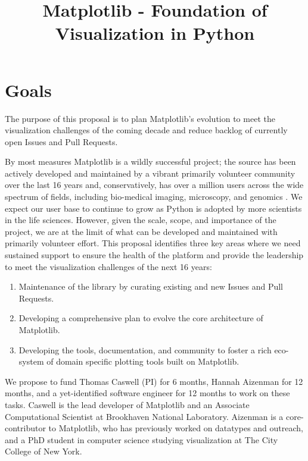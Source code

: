 \documentclass[11pt]{article}  %
\begin{document}
\title{Matplotlib - Foundation of Visualization in Python}
\author{}
\maketitle

\section{Goals}

The purpose of this proposal is to plan Matplotlib's evolution to meet
the visualization challenges of the coming decade and reduce backlog
of currently open Issues and Pull Requests.

By most measures Matplotlib is a wildly successful project; the source
has been actively developed and maintained by a vibrant primarily
volunteer community over the last 16 years and, conservatively, has
over a million users across the wide spectrum of fields, including
bio-medical imaging, microscopy, and genomics
\cite{Carpenter2006,Wolf2018,10.7717/peerj.453}
\cite{Segata2011,10.1371/journal.pgen.1000695,HASHIMSHONY2012666,
  10.1093/bioinformatics/bts480,Carlile2014,Laganowsky2014,Jiangaac9462,
  10.3389/fninf.2014.00014}.  We expect our user base to continue to
grow as Python is adopted by more scientists in the life sciences.
However, given the scale, scope, and importance of the project, we are
at the limit of what can be developed and maintained with primarily
volunteer effort.  This proposal identifies three key areas where we
need sustained support to ensure the health of the platform and
provide the leadership to meet the visualization challenges of the
next 16 years:

\begin{enumerate}[label=\alph*)]
  \item Maintenance of the library by curating existing and new Issues
    and Pull Requests.
  \item Developing a comprehensive plan to evolve the core architecture
    of Matplotlib.
  \item Developing the tools, documentation, and community to foster a
    rich eco-system of domain specific plotting tools built on
    Matplotlib.
\end{enumerate}

We propose to fund Thomas Caswell (PI) for 6 months, Hannah Aizenman
for 12 months, and a yet-identified software engineer for 12 months to
work on these tasks.  Caswell is the lead developer of Matplotlib and
an Associate Computational Scientist at Brookhaven National
Laboratory.  Aizenman is a core-contributor to Matplotlib, who has
previously worked on datatypes and outreach, and a PhD student in
computer science studying visualization at The City College of New
York.
\end{document}
